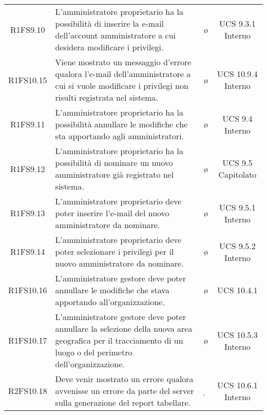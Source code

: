 {\begin{longtable}{ c C{6.5cm} c c}
R1FS9.10 & L'amministratore proprietario ha la possibilità di inserire la e-mail dell'account amministratore a cui desidera modificare i privilegi. & \o & UCS 9.3.1 Interno\\

R1FS10.15 & Viene mostrato un messaggio d'errore qualora l'e-mail dell'amministratore a cui si vuole modificare i privilegi non risulti registrata nel sistema. & \o & UCS 10.9.4 Interno\\

R1FS9.11 & L'amministratore proprietario ha la possibilità annullare le modifiche che sta apportando agli amministratori. & \o & UCS 9.4 Interno\\

R1FS9.12 & L'amministratore proprietario ha la possibilità di nominare un nuovo amministratore già registrato nel sistema. & \o & UCS 9.5 Capitolato\\

R1FS9.13 & L'amministratore proprietario deve poter inserire l'e-mail del nuovo amministratore da nominare. & \o & UCS 9.5.1 Interno\\

R1FS9.14 & L'amministratore proprietario deve poter selezionare i privilegi per il nuovo amministratore da nominare. & \o & UCS 9.5.2 Interno\\

R1FS10.16 & L'amministratore gestore deve poter annullare le modifiche che stava apportando all'organizzazione. & \o & UCS 10.4.1\\

R1FS10.17 & L'amministratore gestore deve poter annullare la selezione della nuova area geografica per il tracciamento di un luogo o del perimetro dell'organizzazione. & \o & UCS 10.5.3 Interno\\

R2FS10.18 & Deve venir mostrato un errore qualora avvenisse un errore da parte del server sulla generazione del report tabellare. & \d & UCS 10.6.1 Interno\\

\end{longtable}
}